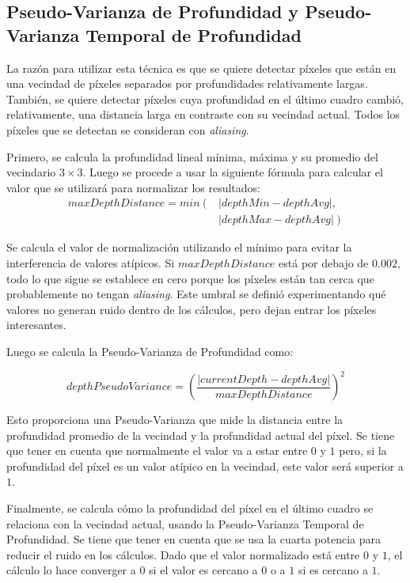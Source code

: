 \documentclass[pregrado]{tesis-usb} %
\begin{document}
\subsection{Pseudo-Varianza de Profundidad y Pseudo-Varianza Temporal de Profundidad}
La razón para utilizar esta técnica es que se quiere detectar píxeles que están en una vecindad de píxeles separados por profundidades relativamente largas. También, se quiere detectar píxeles cuya profundidad en el último cuadro cambió, relativamente, una distancia larga en contraste con su vecindad actual. Todos los píxeles que se detectan se consideran con \textit{aliasing}.

Primero, se calcula la profundidad lineal mínima, máxima y su promedio del vecindario $3\times 3$. Luego se procede a usar la siguiente fórmula para calcular el valor que se utilizará para normalizar los resultados: 
\begin{equation} \label{eq:maxdepthdistance}
\begin{split} 
	maxDepthDistance = min \left( \right. & \left| depthMin-depthAvg \right|  ,   \\ 
	 &  \left.\left| depthMax-depthAvg\right| \right) 
\end{split} 
\end{equation}

Se calcula el valor de normalización utilizando el mínimo para evitar la interferencia de valores atípicos. Si $maxDepthDistance$ está por debajo de $0.002$, todo lo que sigue se establece en cero porque los píxeles están tan cerca que probablemente no tengan \textit{aliasing}. Este umbral se definió experimentando qué valores no generan ruido dentro de los cálculos, pero dejan entrar los píxeles interesantes.

Luego se calcula la Pseudo-Varianza de Profundidad como:

\begin{equation} \label{eq:depthpseudovariance}
	depthPseudoVariance = \left( \frac{\left|currentDepth-depthAvg\right|}{maxDepthDistance}\right)^2
\end{equation}

Esto proporciona una Pseudo-Varianza que mide la distancia entre la profundidad promedio de la vecindad y la profundidad actual del píxel. Se tiene que tener en cuenta que normalmente el valor va a estar entre $0$ y $1$ pero, si la profundidad del píxel es un valor atípico en la vecindad, este valor será superior a $1$.

Finalmente, se calcula cómo la profundidad del píxel en el último cuadro se relaciona con la vecindad actual, usando la Pseudo-Varianza Temporal de Profundidad. Se tiene que tener en cuenta que se usa la cuarta potencia para reducir el ruido en los cálculos. Dado que el valor normalizado está entre $0$ y $1$, el cálculo lo hace converger a $0$ si el valor es cercano a $0$ o a $1$ si es cercano a $1$.
\end{document}
